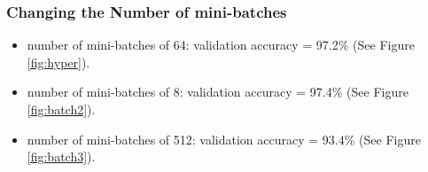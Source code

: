 \documentclass[a4paper]{article}
\begin{document}
\begin{enumerate}
%
%
%
%
%  
%
%

\subsubsection{Changing the Number of mini-batches}


\begin{itemize}

\item number of mini-batches of 64: validation accuracy = 97.2\% (See Figure \ref{fig:hyper}).

\item number of mini-batches of 8: validation accuracy = 97.4\% (See Figure \ref{fig:batch2}).

\item number of mini-batches of 512: validation accuracy = 93.4\% (See Figure \ref{fig:batch3}).  
  

\end{itemize}
\end{enumerate}
\end{document}
